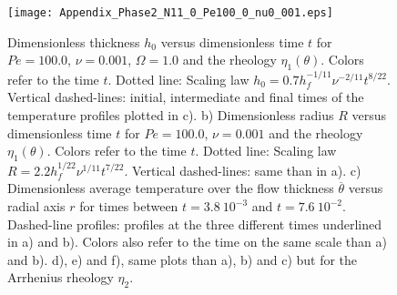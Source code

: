 \begin{figure}[htpb]
  \begin{center}
    \graphicspath{ {/Users/thorey/Documents/These/Projet/Refroidissement/Skin_Model/Figure/Figure_Heating/} }
    \texttt{[image: Appendix\_Phase2\_N11\_0\_Pe100\_0\_nu0\_001.eps]}
    \caption{Dimensionless thickness  $h_0$ versus  dimensionless time
      $t$ for  $Pe=100.0$, $\nu=0.001$, $\Omega=1.0$ and  the rheology
      $\eta_1(\theta)$.  Colors  refer to the time  $t$.  Dotted line:
      Scaling  law $h_0=  0.7h_f^{-1/11}\nu^{-2/11}t^{8/22}$. Vertical
      dashed-lines:  initial,  intermediate  and final  times  of  the
      temperature profiles plotted in c).  b) Dimensionless radius $R$
      versus dimensionless  time $t$  for $Pe=100.0$,  $\nu=0.001$ and
      the rheology  $\eta_1(\theta)$.  Colors  refer to the  time $t$.
      Dotted line:  Scaling law  $R= 2.2h_f^{1/22}\nu^{1/11}t^{7/22}$.
      Vertical dashed-lines: same than in a). c) Dimensionless average
      temperature over  the flow thickness  $\overline{\theta}$ versus
      radial   axis  $r$   for  times   between  $t=3.8~10^{-3}$   and
      $t=7.6~10^{-2}$.   Dashed-line profiles:  profiles at  the three
      different times  underlined in a)  and b). Colors also  refer to
      the time on the same scale than  a) and b).  d), e) and f), same
      plots  than  a),  b)  and  c) but  for  the  Arrhenius  rheology
      $\eta_2$.}
    \label{C4-Appendix_Phase2_N11_0_Pe100_0_nu0_001}
  \end{center}
\end{figure}

\newpage





